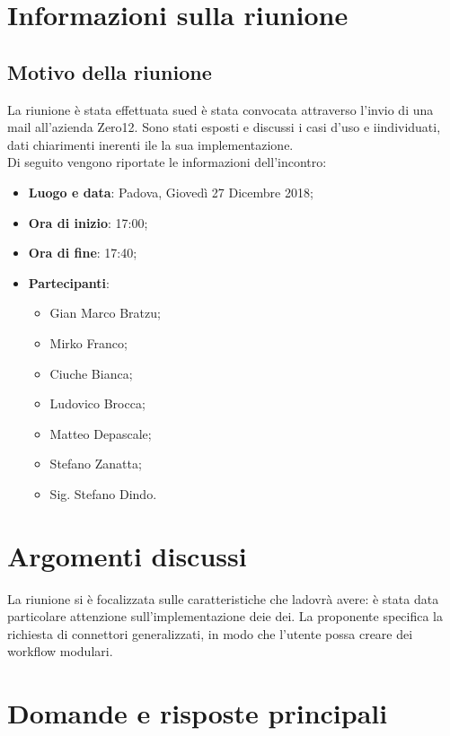 \documentclass[a4paper,12pt]{article}
\begin{document}
	\cleardoublepage
	\pagestyle{mymain}
	
	\tableofcontents
	\cleardoublepage

	\section{Informazioni sulla riunione}
	\subsection{Motivo della riunione}
	La riunione è stata effettuata sued è stata convocata attraverso l'invio di una mail all'azienda Zero12. Sono stati esposti e discussi i casi d'uso e iindividuati, dati chiarimenti inerenti ile la sua implementazione.\\
	Di seguito vengono riportate le informazioni dell'incontro:
	\begin{itemize}
		\item \textbf{Luogo e data}: Padova, Giovedì 27 Dicembre 2018;
		\item \textbf{Ora di inizio}: 17:00;
		\item \textbf{Ora di fine}: 17:40;
		\item \textbf{Partecipanti}:  
		\begin{itemize}
			\item Gian Marco Bratzu;
			\item Mirko Franco;
			\item Ciuche Bianca;
			\item Ludovico Brocca;
			\item Matteo Depascale;
			\item Stefano Zanatta;
			\item Sig. Stefano Dindo.
		\end{itemize}
	\end{itemize}

	\section{Argomenti discussi}
	La riunione si è focalizzata sulle caratteristiche che ladovrà avere: è stata data particolare attenzione sull'implementazione deie dei. La proponente specifica la richiesta di connettori generalizzati, in modo che l'utente possa creare dei workflow modulari.
	\section{Domande e risposte principali}
\end{document}
